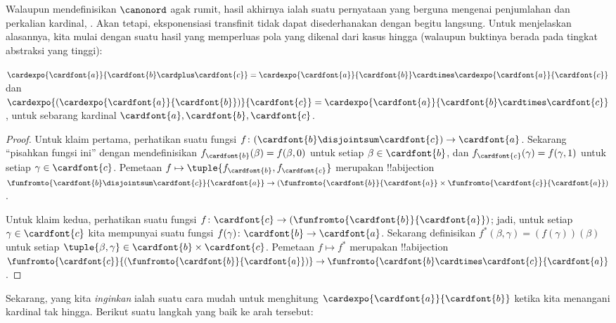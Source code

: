 \documentclass[../../../include/open-logic-section]{subfiles}
\begin{document}


Walaupun mendefinisikan $\canonord$ agak rumit, hasil akhirnya ialah suatu
pernyataan yang berguna mengenai penjumlahan dan perkalian kardinal,
. Akan tetapi, eksponensiasi transfinit tidak
dapat disederhanakan dengan begitu langsung. Untuk menjelaskan alasannya,
kita mulai dengan suatu hasil yang memperluas pola yang dikenal dari kasus
hingga (walaupun buktinya berada pada tingkat abstraksi yang tinggi):

\begin{prop}
$\cardexpo{\cardfont{a}}{\cardfont{b} \cardplus \cardfont{c}} =
\cardexpo{\cardfont{a}}{\cardfont{b}} \cardtimes
\cardexpo{\cardfont{a}}{\cardfont{c}}$ dan
$\cardexpo{(\cardexpo{\cardfont{a}}{\cardfont{b}})}{\cardfont{c}} =
\cardexpo{\cardfont{a}}{\cardfont{b} \cardtimes \cardfont{c}}$, untuk
sebarang kardinal $\cardfont{a}, \cardfont{b}, \cardfont{c}$.
\end{prop}

\begin{proof}
Untuk klaim pertama, perhatikan suatu fungsi $f \colon
(\cardfont{b}\disjointsum\cardfont{c}) \to \cardfont{a}$. Sekarang
``pisahkan fungsi ini'' dengan mendefinisikan
$f_\cardfont{b}(\beta) = f(\beta, 0)$ untuk setiap
$\beta \in \cardfont{b}$, dan
$f_\cardfont{c}(\gamma) = f(\gamma, 1)$ untuk setiap
$\gamma \in \cardfont{c}$. Pemetaan
$f \mapsto \tuple{f_{\cardfont{b}}, f_\cardfont{c}}$ merupakan
!!a{bijection}
$\funfromto{\cardfont{b} \disjointsum \cardfont{c}}{\cardfont{a}} \to
(\funfromto{\cardfont{b}}{\cardfont{a}} \times
\funfromto{\cardfont{c}}{\cardfont{a}})$.

Untuk klaim kedua, perhatikan suatu fungsi
$f \colon \cardfont{c} \to
(\funfromto{\cardfont{b}}{\cardfont{a}})$; jadi, untuk setiap
$\gamma \in \cardfont{c}$ kita mempunyai suatu fungsi
$f(\gamma) \colon \cardfont{b} \to \cardfont{a}$. Sekarang definisikan
$f^*(\beta, \gamma) = (f(\gamma))(\beta)$ untuk setiap
$\tuple{\beta, \gamma} \in \cardfont{b} \times \cardfont{c}$.
Pemetaan $f \mapsto f^*$ merupakan !!a{bijection}
$\funfromto{\cardfont{c}}{(\funfromto{\cardfont{b}}{\cardfont{a}})}
\to \funfromto{\cardfont{b} \cardtimes \cardfont{c}}{\cardfont{a}}$.
\end{proof}

Sekarang, yang kita \emph{inginkan} ialah suatu cara mudah untuk menghitung
$\cardexpo{\cardfont{a}}{\cardfont{b}}$ ketika kita menangani kardinal tak
hingga. Berikut suatu langkah yang baik ke arah tersebut:
\end{document}
